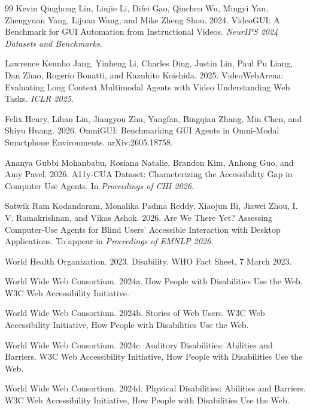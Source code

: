 \documentclass[11pt]{article}
\begin{document}
\begin{thebibliography}{99}
Kevin Qinghong Lin, Linjie Li, Difei Gao, Qinchen Wu, Mingyi Yan, Zhengyuan Yang, Lijuan Wang, and Mike Zheng Shou. 2024.
\newblock VideoGUI: A Benchmark for GUI Automation from Instructional Videos.
\newblock \emph{NeurIPS 2024 Datasets and Benchmarks}.

Lawrence Keunho Jang, Yinheng Li, Charles Ding, Justin Lin, Paul Pu Liang, Dan Zhao, Rogerio Bonatti, and Kazuhito Koishida. 2025.
\newblock VideoWebArena: Evaluating Long Context Multimodal Agents with Video Understanding Web Tasks.
\newblock \emph{ICLR 2025}.

Felix Henry, Lihan Lin, Jiangyou Zhu, Yangfan, Bingqian Zhang, Min Chen, and Shiyu Huang. 2026.
\newblock OmniGUI: Benchmarking GUI Agents in Omni-Modal Smartphone Environments.
\newblock arXiv:2605.18758.

Ananya Gubbi Mohanbabu, Rosiana Natalie, Brandon Kim, Anhong Guo, and Amy Pavel. 2026.
\newblock A11y-CUA Dataset: Characterizing the Accessibility Gap in Computer Use Agents.
\newblock In \emph{Proceedings of CHI 2026}.

Satwik Ram Kodandaram, Monalika Padma Reddy, Xiaojun Bi, Jiawei Zhou, I. V. Ramakrishnan, and Vikas Ashok. 2026.
\newblock Are We There Yet? Assessing Computer-Use Agents for Blind Users' Accessible Interaction with Desktop Applications.
\newblock To appear in \emph{Proceedings of EMNLP 2026}.

World Health Organization. 2023.
\newblock Disability.
\newblock WHO Fact Sheet, 7 March 2023.

World Wide Web Consortium. 2024a.
\newblock How People with Disabilities Use the Web.
\newblock W3C Web Accessibility Initiative.

World Wide Web Consortium. 2024b.
\newblock Stories of Web Users.
\newblock W3C Web Accessibility Initiative, How People with Disabilities Use the Web.

World Wide Web Consortium. 2024c.
\newblock Auditory Disabilities: Abilities and Barriers.
\newblock W3C Web Accessibility Initiative, How People with Disabilities Use the Web.

World Wide Web Consortium. 2024d.
\newblock Physical Disabilities: Abilities and Barriers.
\newblock W3C Web Accessibility Initiative, How People with Disabilities Use the Web.


\end{thebibliography}
\end{document}
